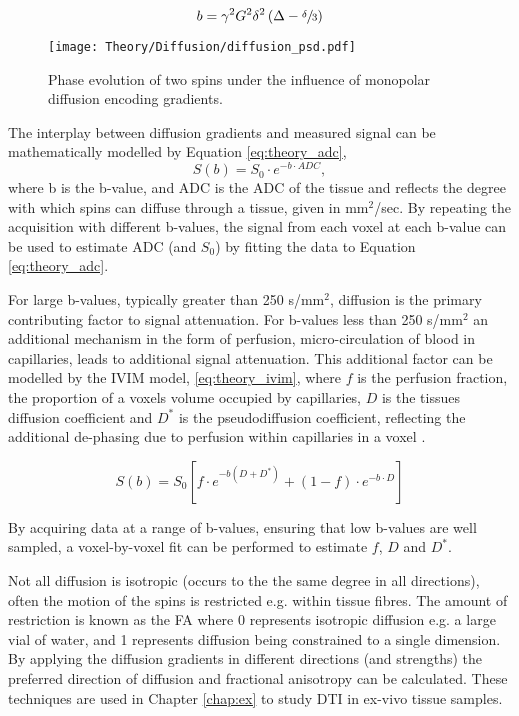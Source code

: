 \begin{equation}
	b=\gamma^2 G^2 \delta^2 \left( \Delta - \sfrac{\delta}{3}\right)
	\label{eq:theory_stejskal_tanner}
\end{equation}

\begin{figure}[H]
	\centering
	\texttt{[image: Theory/Diffusion/diffusion\_psd.pdf]}
	\caption{Phase evolution of two spins under the influence of monopolar diffusion encoding gradients.}
	\label{fig:theory_diffusion_psd}	
\end{figure}

The interplay between diffusion gradients and measured signal can be mathematically modelled by Equation \eqref{eq:theory_adc},
\begin{equation}
	S\left( b \right) = S_0 \cdot e^{-b \cdot ADC},
	\label{eq:theory_adc}
\end{equation}
where b is the b-value, and \acs{ADC} is the \acl{ADC} of the tissue and reflects the degree with which spins can diffuse through a tissue, given in mm$^2$/sec. By repeating the acquisition with different b-values, the signal from each voxel at each b-value can be used to estimate \ac{ADC} (and $S_0$) by fitting the data to Equation \eqref{eq:theory_adc}.

For large b-values, typically greater than 250 s/mm$^2$, diffusion is the primary contributing factor to signal attenuation. For b-values less than 250 s/mm$^2$ an additional mechanism in the form of perfusion, micro-circulation of blood in capillaries, leads to additional signal attenuation. This additional factor can be modelled by the \ac{IVIM} model, \eqref{eq:theory_ivim}, where $f$ is the perfusion fraction, the proportion of a voxels volume occupied by capillaries, $D$ is the tissues diffusion coefficient and $D^*$ is the pseudodiffusion coefficient, reflecting the additional de-phasing due to perfusion within capillaries in a voxel \cite{le_bihan_mr_1986,le_bihan_separation_1988}.

\begin{equation}
	S\left( b \right) = S_0 \left[ f \cdot e^{-b\left(D + D^*\right)} + \left( 1 - f\right) \cdot e^{-b \cdot D}\right]
	\label{eq:theory_ivim}
\end{equation}

By acquiring data at a range of b-values, ensuring that low b-values are well sampled, a voxel-by-voxel fit can be performed to estimate $f$, $D$ and $D^*$.

Not all diffusion is isotropic (occurs to the the same degree in all directions), often the motion of the spins is restricted e.g. within tissue fibres. The amount of restriction is known as the \ac{FA} where 0 represents isotropic diffusion e.g. a large vial of water, and 1 represents diffusion being constrained to a single dimension. By applying the diffusion gradients in different directions (and strengths) the preferred direction of diffusion and fractional anisotropy can be calculated. These techniques are used in Chapter \ref{chap:ex} to study \ac{DTI} in ex-vivo tissue samples.

